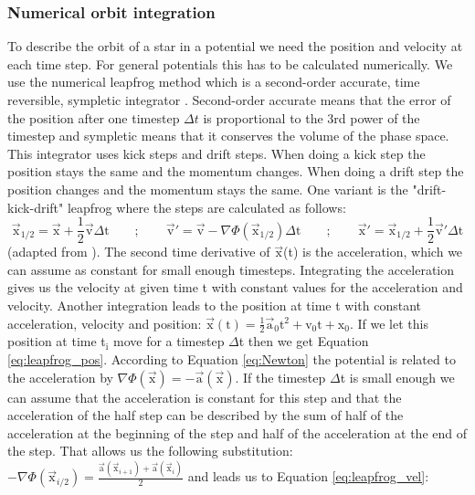\subsubsection{Numerical orbit integration}\label{sec:num_int}
\par To describe the orbit of a star in a potential we need the position and velocity at each time step. For general potentials this has to be calculated numerically. We use the numerical leapfrog method which is a second-order accurate, time reversible, sympletic integrator \citep[p.199/200]{2008gady.book.....B}. Second-order accurate means that the error of the position after one timestep \(\Delta t\) is proportional to the 3rd power of the timestep and sympletic means that it conserves the volume of the phase space. This integrator uses kick steps and drift steps. When doing a kick step the position stays the same and the momentum changes. When doing a drift step the position changes and the momentum stays the same. One variant is the "drift-kick-drift" leapfrog where the steps are calculated as follows:
\begin{equation}\label{eq:drift-kick-drift}
\vec{\mathrm{x}}_{1/2} = \vec{\mathrm{x}}+\frac{1}{2}  \vec{\mathrm{v}}\Delta \mathrm{t} \qquad;\qquad \vec{\mathrm{v}}'=\vec{\mathrm{v}}- \nabla\Phi(\vec{\mathrm{x}}_{1/2})\Delta\mathrm{t} \qquad ; \qquad \vec{\mathrm{x}}' = \vec{\mathrm{x}}_{1/2}+\frac{1}{2} \vec{\mathrm{v}}' \Delta \mathrm{t}
\end{equation} (adapted from \citet[eq. 3.166a]{2008gady.book.....B}).
The second time derivative of \(\vec{\mathrm{x}}\)(t) is the acceleration, which we can assume as constant for small enough timesteps. Integrating the acceleration gives us the velocity at given time t with constant values for the acceleration and velocity. Another integration leads to the position at time t with constant acceleration, velocity and position: \(\vec{\mathrm{x}}(\mathrm{t})=\frac{1}{2}\vec{\mathrm{a}}_0\mathrm{t}^2+\mathrm{v_0t+x_0} \). If we let this position at time t\(_\mathrm{i}\) move for a timestep \(\Delta\)t then we get Equation \eqref{eq:leapfrog_pos}. According to Equation \eqref{eq:Newton} the potential is related to the acceleration by \(\nabla\Phi(\vec{\mathrm{x}})=-\vec{\mathrm{a}}(\vec{\mathrm{x}})\). If the timestep \(\Delta\)t is small enough we can assume that the acceleration is constant for this step and that the acceleration of the half step can be described by the sum of half of the acceleration at the beginning of the step and half of the acceleration at the end of the step. That allows us the following substitution: \(-\nabla\Phi(\vec{\mathrm{x}}_{i/2})=\frac{ \vec{\mathrm{a}}(\vec{\mathrm{x}}_{i+1})+\vec{\mathrm{a}}(\vec{\mathrm{x}}_i)}{2}\) and leads us to Equation \eqref{eq:leapfrog_vel}:
